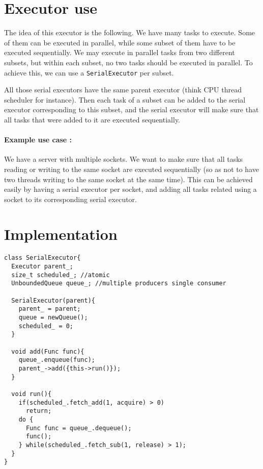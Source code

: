 \documentclass[12pt]{article}
\begin{document}
\section{Executor use}
The idea of this executor is the following. We have many tasks to execute. Some of them can be executed in parallel, while some subset of them have to be executed sequentially. We may execute in parallel tasks from two different subsets, but within each subset, no two tasks should be executed in parallel. To achieve this, we can use a \texttt{SerialExecutor} per subset.

All those serial executors have the same parent executor (think CPU thread scheduler for instance). Then each task of a subset can be added to the serial executor corresponding to this subset, and the serial executor will make sure that all tasks that were added to it are executed sequentially.

\paragraph{Example use case :} We have a server with multiple sockets. We want to make sure that all tasks reading or writing to the same socket are executed sequentially (so as not to have two threads writing to the same socket at the same time). This can be achieved easily by having a serial executor per socket, and adding all tasks related using a socket to its corresponding serial executor.

\section{Implementation}

\begin{lstlisting}
class SerialExecutor{
  Executor parent_;
  size_t scheduled_; //atomic
  UnboundedQueue queue_; //multiple producers single consumer

  SerialExecutor(parent){
    parent_ = parent;
    queue = newQueue();
	scheduled_ = 0;
  }

  void add(Func func){
    queue_.enqueue(func);
    parent_->add({this->run()});
  }

  void run(){
    if(scheduled_.fetch_add(1, acquire) > 0)
      return;
    do {
      Func func = queue_.dequeue();
      func();
    } while(scheduled_.fetch_sub(1, release) > 1);
  }
}
\end{lstlisting}
\end{document}

